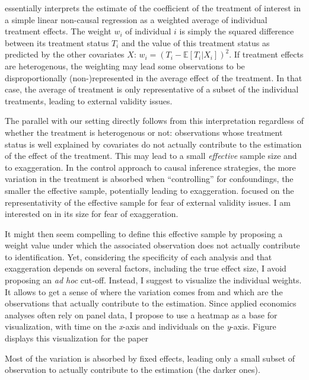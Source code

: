 \documentclass[usletter, 12pt]{article}
\begin{document}
				\cite{aronow_does_2016} essentially interprets the estimate of the coefficient of the treatment of interest in a simple linear non-causal regression as a weighted average of individual treatment effects. The weight $w_{i}$ of individual $i$ is simply the squared difference between its treatment status $T_{i}$ and the value of this treatment status as predicted by the other covariates $X$: $w_{i} = (T_{i} - \mathbb{E}[T_{i} | X_{i}])^{2}$. If treatment effects are heterogenous, the weighting may lead some observations to be disproportionally (non-)represented in the average effect of the treatment. %
				In that case, the average of treatment is only representative of a subset of the individual treatments, leading to external validity issues. 
				
				The parallel with our setting directly follows from this interpretation regardless of whether the treatment is heterogenous or not: observations whose treatment status is well explained by covariates do not actually contribute to the estimation of the effect of the treatment. This may lead to a small \textit{effective} sample size and to exaggeration. In the control approach to causal inference strategies, the more variation in the treatment is absorbed when ``controlling'' for confoundings, the smaller the effective sample, potentially leading to exaggeration. \cite{aronow_does_2016} focused on the representativity of the effective sample for fear of external validity issues. I am interested on in its size for fear of exaggeration.
				
				It might then seem compelling to define this effective sample by proposing a weight value under which the associated observation does not actually contribute to  identification. Yet, considering the specificity of each analysis and that exaggeration depends on several factors, including the true effect size, I avoid proposing an \textit{ad hoc} cut-off. Instead, I suggest to visualize the individual weights. It allows to get a sense of where the variation comes from and which are the observations that actually contribute to the estimation. Since applied economics analyses often rely on panel data, I propose to use a heatmap as a base for visualization, with time on the \textit{x}-axis and individuals on the \textit{y}-axis. Figure %
				displays this visualization for the paper
				
				Most of the variation is absorbed by fixed effects, leading only a small subset of observation to actually contribute to the estimation (the darker ones).
				
\end{document}
